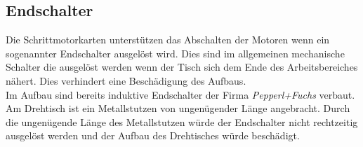 
\subsection{Endschalter}
\label{sec:Endschalter}
Die Schrittmotorkarten unterstützen das Abschalten der Motoren wenn ein sogenannter Endschalter ausgelöst wird. Dies sind im allgemeinen mechanische Schalter die ausgelöst werden wenn der Tisch sich dem Ende des Arbeitsbereiches nähert. Dies verhindert eine Beschädigung des Aufbaus.\\
Im Aufbau sind bereits induktive Endschalter der Firma \textit{Pepperl+Fuchs} verbaut. 
Am Drehtisch ist ein Metallstutzen von ungenügender Länge angebracht. Durch die ungenügende Länge des Metallstutzen würde der Endschalter nicht rechtzeitig ausgelöst werden und der Aufbau des Drehtisches würde beschädigt.

